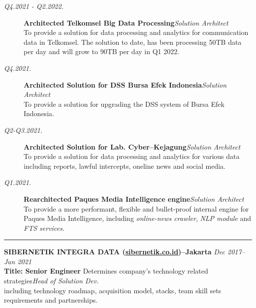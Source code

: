 \documentclass[12pt]{res} %
\begin{document}
\begin{resume}
\vspace{10pt} 
\begin{description}
	\item[{\sl {\footnotesize Q4.2021 - Q2.2022}.}] {\bf Architected Telkomsel Big Data Processing}\hfill {\sl Solution Architect}\\
	To provide a solution for data processing and analytics for communication data in Telkomsel. The solution to date, has been
    processing 50TB data per day and will grow to 90TB per day in Q1 2022.
	\item[{\sl {\footnotesize Q4.2021}.}] {\bf Architected Solution for DSS Bursa Efek Indonesia}\hfill {\sl Solution Architect}\\
	To provide a solution for upgrading the DSS system of Bursa Efek Indonesia.
	\item[{\sl {\footnotesize Q2-Q3.2021}.}] {\bf Architected Solution for Lab. Cyber--Kejagung}\hfill {\sl Solution Architect}\\
	To provide a solution for data processing and analytics for various data including reports, lawful intercepts, oneline news and social
    media.
	\item[{\sl {\footnotesize Q1.2021}.}] {\bf Rearchitected Paques Media Intelligence engine}\hfill {\sl Solution Architect}\\
	To provide a more performant, flexible and bullet-proof internal engine for Paques Media Intelligence, including
    {\sl online-news crawler}, {\sl NLP module} and {\sl FTS services}.
\end{description}
\begin{center}
	\rule{0.5\textwidth}{.2pt}
\end{center}

{\bf \uppercase{Sibernetik Integra Data} (\href{https://sibernetik.co.id}{sibernetik.co.id})--Jakarta} \hfill {\sl Dec 2017--Jan 2021} \\
{\bf Title: Senior Engineer} 
Determines company's technology related strategies\hfill {\sl Head of Solution Dev.}\\including technology roadmap, acquisition model, stacks, team skill sets requirements and partnerships.


\end{resume}
\end{document}
